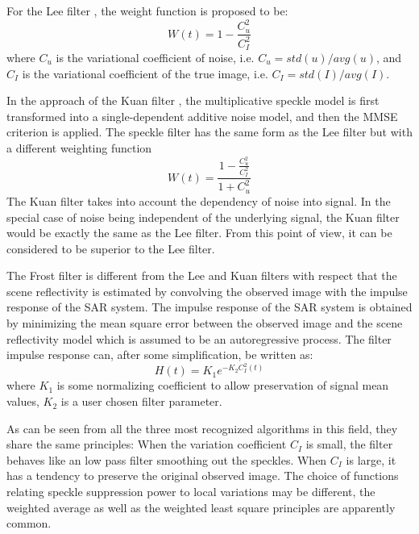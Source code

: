 For the Lee filter \cite{Lee_PAMI_1980}, the weight function is proposed to be:
\begin{equation}
W(t) = 1 - \frac{C_u^2}{C_I^2} 
\end{equation}
where
	$C_u$ is the variational coefficient of noise, i.e. $C_u=std(u)/avg(u)$, and
	$C_I$ is the variational coefficient of the true image, i.e. $C_I=std(I)/avg(I)$.

In the approach of the Kuan filter \cite{Kuan_1985_PAMI}, the multiplicative speckle model is first transformed into a single-dependent additive noise model, and then the MMSE criterion is applied. 
The speckle filter has the same form as the Lee filter but with a different weighting function 
\begin{equation}
W(t) = \frac{1 - \frac{C_u^2}{C_I^2} }{1+ C_u^2} 
\end{equation} 
The Kuan filter takes into account the dependency of noise into signal. 
In the special case of noise being independent of the underlying signal, the Kuan filter would be exactly the same as the Lee filter.
From this point of view, it can be considered to be superior to the Lee filter.

The Frost filter \cite{Frost_PAMI_1982} is different from the Lee and Kuan filters with respect that the scene reflectivity is estimated by convolving the observed image with the impulse response of the SAR system. 
The impulse response of the SAR system is obtained by minimizing the mean square error between the observed image and the scene reflectivity model which is assumed to be an autoregressive process. 
The filter impulse response can, after some simplification, be written as:
\begin{equation}
H(t) = K_1 e^{-K_2 C_I^2(t)}
\end{equation}
where
	$K_1$ is some normalizing coefficient to allow preservation of signal mean values,
	$K_2$ is a user chosen filter parameter.

As can be seen from all the three most recognized algorithms in this field, they share the same principles:
When the variation coefficient $C_I$ is small, the filter behaves like an low pass filter smoothing out the speckles. 
When $C_I$ is large, it has a tendency to preserve the original observed image.
The choice of functions relating speckle suppression power to local variations may be different, 
	the weighted average as well as the weighted least square principles are apparently common.

